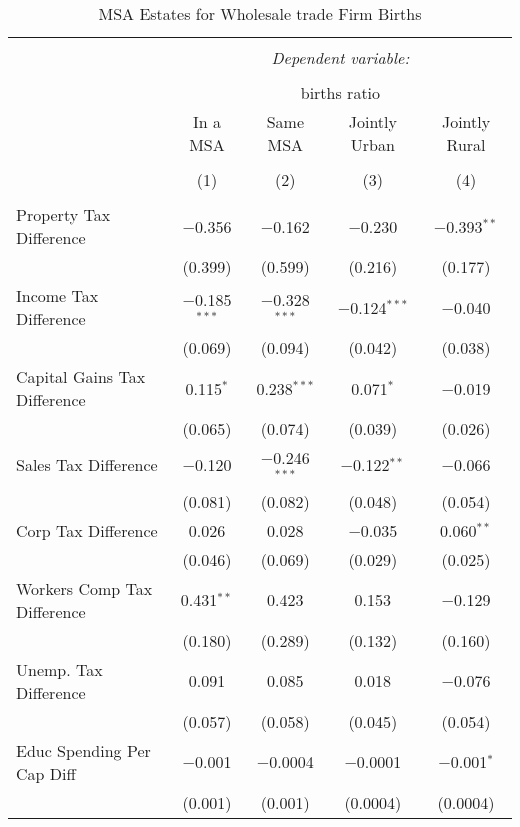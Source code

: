 
\begin{table}[!htbp] \centering 
  \caption{MSA Estates for  Wholesale trade Firm Births} 
  \label{42metro} 
\begin{tabular}{@{\extracolsep{5pt}}lcccc} 
\\[-1.8ex]\hline 
\hline \\[-1.8ex] 
 & \multicolumn{4}{c}{\textit{Dependent variable:}} \\ 
\cline{2-5} 
\\[-1.8ex] & \multicolumn{4}{c}{births ratio} \\ 
 & In a MSA & Same MSA & Jointly Urban & Jointly Rural \\ 
\\[-1.8ex] & (1) & (2) & (3) & (4)\\ 
\hline \\[-1.8ex] 
 Property Tax Difference & $-$0.356 & $-$0.162 & $-$0.230 & $-$0.393$^{**}$ \\ 
  & (0.399) & (0.599) & (0.216) & (0.177) \\ 
  Income Tax Difference & $-$0.185$^{***}$ & $-$0.328$^{***}$ & $-$0.124$^{***}$ & $-$0.040 \\ 
  & (0.069) & (0.094) & (0.042) & (0.038) \\ 
  Capital Gains Tax Difference & 0.115$^{*}$ & 0.238$^{***}$ & 0.071$^{*}$ & $-$0.019 \\ 
  & (0.065) & (0.074) & (0.039) & (0.026) \\ 
  Sales Tax Difference & $-$0.120 & $-$0.246$^{***}$ & $-$0.122$^{**}$ & $-$0.066 \\ 
  & (0.081) & (0.082) & (0.048) & (0.054) \\ 
  Corp Tax Difference & 0.026 & 0.028 & $-$0.035 & 0.060$^{**}$ \\ 
  & (0.046) & (0.069) & (0.029) & (0.025) \\ 
  Workers Comp Tax Difference & 0.431$^{**}$ & 0.423 & 0.153 & $-$0.129 \\ 
  & (0.180) & (0.289) & (0.132) & (0.160) \\ 
  Unemp. Tax Difference & 0.091 & 0.085 & 0.018 & $-$0.076 \\ 
  & (0.057) & (0.058) & (0.045) & (0.054) \\ 
  Educ Spending Per Cap Diff & $-$0.001 & $-$0.0004 & $-$0.0001 & $-$0.001$^{*}$ \\ 
  & (0.001) & (0.001) & (0.0004) & (0.0004) \\ 

\end{tabular}
\end{table}
